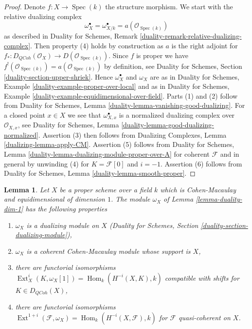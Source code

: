 \documentclass{stacks-project}
\theoremstyle{plain}
\newtheorem{lemma}[subsection]{Lemma}
\theoremstyle{definition}
\theoremstyle{remark}
\numberwithin{equation}{subsection}
\def\Spec{\mathop{\mathrm{Spec}}}
\def\Hom{\mathop{\mathrm{Hom}}\nolimits}
\def\Ext{\mathop{\mathrm{Ext}}\nolimits}
\def\QCoh{\mathit{QCoh}}
\begin{document}
\begin{proof}
Denote $f : X \to \Spec(k)$ the structure morphism.
We start with the relative dualizing complex
$$
\omega_X^\bullet = \omega_{X/k}^\bullet = a(\mathcal{O}_{\Spec(k)})
$$
as described in Duality for Schemes,
Remark \ref{duality-remark-relative-dualizing-complex}.
Then property (4) holds by construction as $a$ is the right
adjoint for $f_* : D_\QCoh(\mathcal{O}_X) \to D(\mathcal{O}_{\Spec(k)})$.
Since $f$ is proper we have
$f^!(\mathcal{O}_{\Spec(k)}) = a(\mathcal{O}_{\Spec(k)})$ by
definition, see
Duality for Schemes, Section \ref{duality-section-upper-shriek}.
Hence $\omega_X^\bullet$ and $\omega_X$ are as in
Duality for Schemes, Example \ref{duality-example-proper-over-local}
and as in
Duality for Schemes, Example \ref{duality-example-equidimensional-over-field}.
Parts (1) and (2) follow from
Duality for Schemes, Lemma \ref{duality-lemma-vanishing-good-dualizing}.
For a closed point $x \in X$ we see that $\omega_{X, x}^\bullet$ is a
normalized dualizing complex over $\mathcal{O}_{X, x}$, see
Duality for Schemes, Lemma \ref{duality-lemma-good-dualizing-normalized}.
Assertion (3) then follows from
Dualizing Complexes, Lemma \ref{dualizing-lemma-apply-CM}.
Assertion (5) follows from
Duality for Schemes, Lemma \ref{duality-lemma-dualizing-module-proper-over-A}
for coherent $\mathcal{F}$ and in general by unwinding
(4) for $K = \mathcal{F}[0]$ and $i = -1$.
Assertion (6) follows from Duality for Schemes,
Lemma \ref{duality-lemma-smooth-proper}.
\end{proof}

\begin{lemma}
\label{lemma-duality-dim-1-CM}
Let $X$ be a proper scheme over a field $k$ which is Cohen-Macaulay
and equidimensional of dimension $1$. The module $\omega_X$
of Lemma \ref{lemma-duality-dim-1} has the following properties
\begin{enumerate}
\item $\omega_X$ is a dualizing module on $X$
(Duality for Schemes, Section \ref{duality-section-dualizing-module}),
\item $\omega_X$ is a coherent Cohen-Macaulay module whose support is $X$,
\item there are functorial isomorphisms
$\Ext^i_X(K, \omega_X[1]) = \Hom_k(H^{-i}(X, K), k)$
compatible with shifts for $K \in D_\QCoh(X)$,
\item there are functorial isomorphisms
$\Ext^{1 + i}(\mathcal{F}, \omega_X) = \Hom_k(H^{-i}(X, \mathcal{F}), k)$
for $\mathcal{F}$ quasi-coherent on $X$.
\end{enumerate}
\end{lemma}
\end{document}
